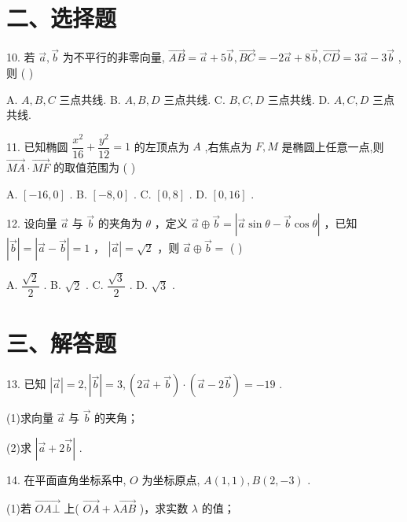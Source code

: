 \section*{二、选择题}

10. 若 $\overrightarrow{a},\overrightarrow{b}$ 为不平行的非零向量, $\overrightarrow{AB} = \overrightarrow{a} + 5\overrightarrow{b},\overrightarrow{BC} =  - 2\overrightarrow{a} + 8\overrightarrow{b},\overrightarrow{CD} = 3\overrightarrow{a} - 3\overrightarrow{b}$ ,则 ( )

A. $A,B,C$ 三点共线. B. $A,B,D$ 三点共线. C. $B,C,D$ 三点共线. D. $A,C,D$ 三点共线.

11. 已知椭圆 $\dfrac{{x}^{2}}{16} + \dfrac{{y}^{2}}{12} = 1$ 的左顶点为 $A$ ,右焦点为 $F,M$ 是椭圆上任意一点,则 $\overrightarrow{MA} \cdot  \overrightarrow{MF}$ 的取值范围为 ( )

A. $\left\lbrack  {-{16},0}\right\rbrack$ . B. $\left\lbrack  {-8,0}\right\rbrack$ . C. $\left\lbrack  {0,8}\right\rbrack$ . D. $\left\lbrack  {0,{16}}\right\rbrack$ .

12. 设向量 $\overrightarrow{a}$ 与 $\overrightarrow{b}$ 的夹角为 $\theta$ ，定义 $\overrightarrow{a} \oplus  \overrightarrow{b} = \left| {\overrightarrow{a}\sin \theta  - \overrightarrow{b}\cos \theta }\right|$ ，已知 $\left| \overrightarrow{b}\right|  = \left| {\overrightarrow{a} - \overrightarrow{b}}\right|  = 1$ ， $\left| \overrightarrow{a}\right|  = \sqrt{2}$ ，则 $\overrightarrow{a} \oplus  \overrightarrow{b} =$ ( )

A. $\dfrac{\sqrt{2}}{2}$ . B. $\sqrt{2}$ . C. $\dfrac{\sqrt{3}}{2}$ . D. $\sqrt{3}$ .

\section*{三、解答题}

13. 已知 $\left| \overrightarrow{a}\right|  = 2,\left| \overrightarrow{b}\right|  = 3,\left( {2\overrightarrow{a} + \overrightarrow{b}}\right)  \cdot  \left( {\overrightarrow{a} - 2\overrightarrow{b}}\right)  =  - {19}$ .

(1)求向量 $\overrightarrow{a}$ 与 $\overrightarrow{b}$ 的夹角；

(2)求 $\left| {\overrightarrow{a} + 2\overrightarrow{b}}\right|$ .

14. 在平面直角坐标系中, $O$ 为坐标原点, $A\left( {1,1}\right) ,B\left( {2, - 3}\right)$ .

(1)若 $\overrightarrow{{OA} \bot  }$ 上( $\overrightarrow{OA} + \lambda \overrightarrow{AB}$ )，求实数 $\lambda$ 的值；

